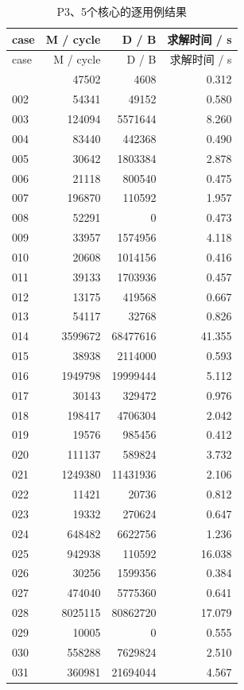 \documentclass[anonymous,notoc]{gmcm2026}
\begin{document}
\begin{longtable}{lrrr}
\caption{P3、5个核心的逐用例结果}\\
\toprule
case & M / cycle & D / B & 求解时间 / s\\\midrule
\endfirsthead
\toprule
case & M / cycle & D / B & 求解时间 / s\\\midrule
\endhead
\bottomrule\endfoot
001 & 47502 & 4608 & 0.312 \\
002 & 54341 & 49152 & 0.580 \\
003 & 124094 & 5571644 & 8.260 \\
004 & 83440 & 442368 & 0.490 \\
005 & 30642 & 1803384 & 2.878 \\
006 & 21118 & 800540 & 0.475 \\
007 & 196870 & 110592 & 1.957 \\
008 & 52291 & 0 & 0.473 \\
009 & 33957 & 1574956 & 4.118 \\
010 & 20608 & 1014156 & 0.416 \\
011 & 39133 & 1703936 & 0.457 \\
012 & 13175 & 419568 & 0.667 \\
013 & 54117 & 32768 & 0.826 \\
014 & 3599672 & 68477616 & 41.355 \\
015 & 38938 & 2114000 & 0.593 \\
016 & 1949798 & 19999444 & 5.112 \\
017 & 30143 & 329472 & 0.976 \\
018 & 198417 & 4706304 & 2.042 \\
019 & 19576 & 985456 & 0.412 \\
020 & 111137 & 589824 & 3.732 \\
021 & 1249380 & 11431936 & 2.106 \\
022 & 11421 & 20736 & 0.812 \\
023 & 19332 & 270624 & 0.647 \\
024 & 648482 & 6622756 & 1.236 \\
025 & 942938 & 110592 & 16.038 \\
026 & 30256 & 1599356 & 0.384 \\
027 & 474040 & 5775360 & 0.641 \\
028 & 8025115 & 80862720 & 17.079 \\
029 & 10005 & 0 & 0.555 \\
030 & 558288 & 7629824 & 2.510 \\
031 & 360981 & 21694044 & 4.567 \\

\end{longtable}
\end{document}

